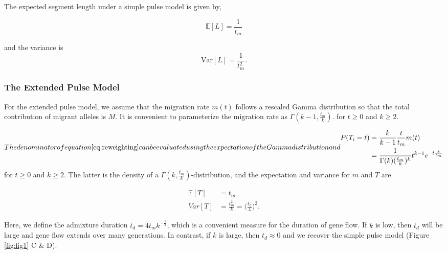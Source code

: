 \documentclass[11pt]{article}
\begin{document}
The expected segment length under a simple pulse model is given by,
	
\begin{equation}
\label{eq:Expected_l_simple_pulse}
\mathbb{E}[L]=\frac{1}{t_m}
\end{equation}
	
and the variance is
\begin{equation}
\label{eq:Expected_v_simple_pulse}
\text{Var}[L]=\frac{1}{t_m^2} \text{.}
\end{equation}
	

\subsubsection{The Extended Pulse Model}\label{The Extended Pulse Model}
	
For the extended pulse model, we assume that the migration rate $m(t)$ follows a rescaled Gamma distribution so that the total contribution of migrant alleles is $M$.  It is convenient to parameterize the migration rate as $\Gamma(k-1,\frac{t_m}{k})$.
for $t \geq 0$ and $k \geq 2$. 

\begin{subequations}
The denominator of equation \ref{eq:reweighting} can be evaluated using the expectation of the Gamma distribution and

\begin{align}
\label{eq:Gamma_density}
    P(T_i=t) &= \frac{k}{k-1}\frac{t }{t_m}m(t)\\
        &=\frac{1}{\Gamma(k)(\frac{t_m}{k})^k}t^{k-1}e^{-t\frac{k}{t_m}} 
\end{align}
\end{subequations}
for $t \geq 0$ and $k \geq 2$. The latter is the density of a $\Gamma(k, \frac{t_m}{k})$-distribution, and the expectation and variance for $m$ and $T$ are 
	
\begin{equation}
\begin{split}
\label{eq:RV_extended_pulse_properties}
\mathbb{E}[T]&=t_{m} \\
	Var[T]&=\frac{t_{m}^2}{k} =
\bigg(\frac{t_d}{4} \bigg)^2 \text{.}
\end{split}
\end{equation}
	
Here, we define the admixture duration $t_d=4t_m k^{-\frac{1}{2}} $, which is a convenient measure for the duration of gene flow. If $k$ is low, then $t_d$ will be large and gene flow extends over many generations. In contrast, if $k$ is large, then $t_d \approx 0$ and we recover the simple pulse model (Figure \ref{fig:fig1} C \& D). 
	
\end{document}
